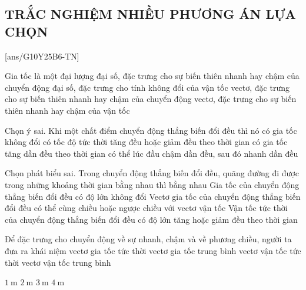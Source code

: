 \subsection{TRẮC NGHIỆM NHIỀU PHƯƠNG ÁN LỰA CHỌN}
\setcounter{ex}{0}
[ans/G10Y25B6-TN]
\begin{ex}
	Gia tốc là một đại lượng
	\choice
	{đại số, đặc trưng cho sự biến thiên nhanh hay chậm của chuyển động}
	{đại số, đặc trưng cho tính không đổi của vận tốc}
	{vectơ, đặc trưng cho sự biến thiên nhanh hay chậm của chuyển động}
	{\True vectơ, đặc trưng cho sự biến thiên nhanh hay chậm của vận tốc}
	\loigiai{}
\end{ex}

\begin{ex}
	Chọn ý sai. Khi một chất điểm chuyển động thẳng biến đổi đều thì nó
	\choice
	{có gia tốc không đổi}
	{có tốc độ tức thời tăng đều hoặc giảm đều theo thời gian}
	{\True có gia tốc tăng dần đều theo thời gian}
	{có thể lúc đầu chậm dần đều, sau đó nhanh dần đều}
	\loigiai{}
\end{ex}

\begin{ex}
	Chọn phát biểu sai.
	\choice
	{\True Trong chuyển động thẳng biến đổi đều, quãng đường đi được trong những khoảng thời gian bằng nhau thì bằng nhau}
	{Gia tốc của chuyển động thẳng biến đổi đều có độ lớn không đổi}
	{Vectơ gia tốc của chuyển động thẳng biến đổi đều có thể cùng chiều hoặc ngược chiều với vectơ vận tốc}
	{Vận tốc tức thời của chuyển động thắng biến đổi đều có độ lớn tăng hoặc giảm đều theo thời gian}
	\loigiai{}
\end{ex}

\begin{ex}
	Để đặc trưng cho chuyển động về sự nhanh, chậm và về phương chiều, người ta đưa ra khái niệm
	\choice
	{vectơ gia tốc tức thời}
	{vectơ gia tốc trung bình}
	{\True vectơ vận tốc tức thời}
	{vectơ vận tốc trung bình}
	\loigiai{}
\end{ex}

\begin{ex}
	\choice
	{$\SI{1}{\meter}$}
	{$\SI{2}{\meter}$}
	{\True $\SI{3}{\meter}$}
	{$\SI{4}{\meter}$}
\end{ex}

